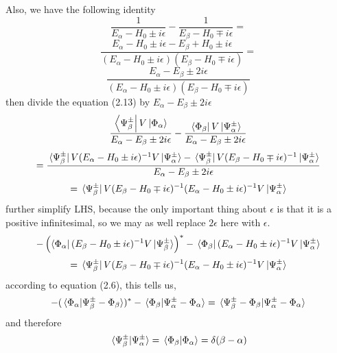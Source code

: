 \documentclass[12pt]{article}
\numberwithin{equation}{section}
\begin{document}
Also, we have the following identity
\[\frac{1}{E_{\alpha}-H_0\pm i\epsilon}-\frac{1}{E_{\beta}-H_0\mp i\epsilon} =\]
\[\frac{E_{\alpha}-H_0\pm i\epsilon - E_{\beta}+H_0\pm i\epsilon}{\left(E_{\alpha}-H_0\pm i\epsilon\right)\left(E_{\beta}-H_0\mp i\epsilon\right)}=\]
\begin{equation}
    \frac{E_{\alpha}-E_{\beta}\pm 2i\epsilon}{\left(E_{\alpha}-H_0\pm i\epsilon\right)\left(E_{\beta}-H_0\mp i\epsilon\right)}
\end{equation}
then divide the equation (2.13) by $E_{\alpha}-E_{\beta}\pm 2i\epsilon$
\[\frac{\bra{\Psi_{\beta}^{\pm}}V\ket*{\Phi_{\alpha}}}{E_{\alpha}-E_{\beta}\pm 2i\epsilon}-\frac{\bra*{\Phi_{\beta}}V\ket*{\Psi_{\alpha}^{\pm}}}{E_{\alpha}-E_{\beta}\pm 2i\epsilon}\]
\[=\frac{\bra*{\Psi_{\beta}^{\pm}}V(E_{\alpha}-H_0\pm i\epsilon)^{-1}V\ket*{\Psi_{\alpha}^{\pm}}-\bra*{\Psi_{\beta}^{\pm}}V(E_{\beta}-H_0\mp i\epsilon)^{-1}\ket*{\Psi_{\alpha}^{\pm}}}{E_{\alpha}-E_{\beta}\pm 2i\epsilon}\]
\begin{equation}
    =\bra*{\Psi_{\beta}^{\pm}}V(E_{\beta}-H_0\mp i\epsilon)^{-1}(E_{\alpha}-H_0\pm i\epsilon)^{-1}V\ket*{\Psi_{\alpha}^{\pm}}
\end{equation}
further simplify LHS, because the only important thing about $\epsilon$ is that it is a positive infinitesimal, so we may as well replace $2\epsilon$ here with $\epsilon$.
\[-\left(\bra{\Phi_{\alpha}}(E_{\beta}-H_0\pm i\epsilon)^{-1}V\ket*{\Psi_{\beta}^{\pm}}\right)^{*} - \bra*{\Phi_{\beta}}(E_{\alpha}-H_0\pm i\epsilon)^{-1}V\ket*{\Psi_{\alpha}^{\pm}}\]
\begin{equation}
    =\bra*{\Psi_{\beta}^{\pm}}V(E_{\beta}-H_0\mp i\epsilon)^{-1}(E_{\alpha}-H_0\pm i\epsilon)^{-1}V\ket*{\Psi_{\alpha}^{\pm}}
\end{equation}
according to equation (2.6), this tells us,
\begin{equation}
    -(\bra*{\Phi_{\alpha}}\ket*{\Psi_{\beta}^{\pm}-\Phi_{\beta}})^{*}-\braket*{\Phi_{\beta}}{\Psi_{\alpha}^{\pm}-\Phi_{\alpha}} = \braket*{\Psi_{\beta}^{\pm}-\Phi_{\beta}}{\Psi_{\alpha}^{\pm}-\Phi_{\alpha}}
\end{equation}
and therefore 
\begin{equation}
    \braket*{\Psi_{\beta}^{\pm}}{\Psi_{\alpha}^{\pm}} = \braket*{\Phi_{\beta}}{\Phi_{\alpha}} = \delta(\beta-\alpha)
\end{equation}
\end{document}
